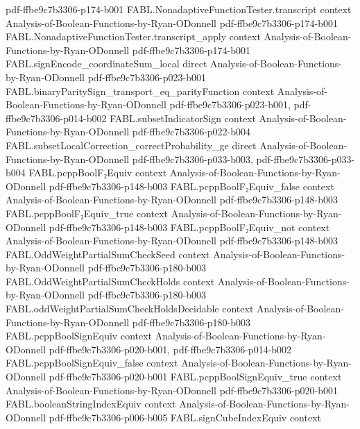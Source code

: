\begin{theorem}
  {pdf-ffbe9c7b3306-p174-b001}
\proofstep
  {FABL.NonadaptiveFunctionTester.transcript}
  {context}
  {Analysis-of-Boolean-Functions-by-Ryan-ODonnell}
  {pdf-ffbe9c7b3306-p174-b001}
\proofstep
  {FABL.NonadaptiveFunctionTester.transcript_apply}
  {context}
  {Analysis-of-Boolean-Functions-by-Ryan-ODonnell}
  {pdf-ffbe9c7b3306-p174-b001}
\proofstep
  {FABL.signEncode_coordinateSum_local}
  {direct}
  {Analysis-of-Boolean-Functions-by-Ryan-ODonnell}
  {pdf-ffbe9c7b3306-p023-b001}
\proofstep
  {FABL.binaryParitySign_transport_eq_parityFunction}
  {context}
  {Analysis-of-Boolean-Functions-by-Ryan-ODonnell}
  {pdf-ffbe9c7b3306-p023-b001,
    pdf-ffbe9c7b3306-p014-b002}
\proofstep
  {FABL.subsetIndicatorSign}
  {context}
  {Analysis-of-Boolean-Functions-by-Ryan-ODonnell}
  {pdf-ffbe9c7b3306-p022-b004}
\proofstep
  {FABL.subsetLocalCorrection_correctProbability_ge}
  {direct}
  {Analysis-of-Boolean-Functions-by-Ryan-ODonnell}
  {pdf-ffbe9c7b3306-p033-b003,
    pdf-ffbe9c7b3306-p033-b004}
\proofstep
  {FABL.pcppBoolF₂Equiv}
  {context}
  {Analysis-of-Boolean-Functions-by-Ryan-ODonnell}
  {pdf-ffbe9c7b3306-p148-b003}
\proofstep
  {FABL.pcppBoolF₂Equiv_false}
  {context}
  {Analysis-of-Boolean-Functions-by-Ryan-ODonnell}
  {pdf-ffbe9c7b3306-p148-b003}
\proofstep
  {FABL.pcppBoolF₂Equiv_true}
  {context}
  {Analysis-of-Boolean-Functions-by-Ryan-ODonnell}
  {pdf-ffbe9c7b3306-p148-b003}
\proofstep
  {FABL.pcppBoolF₂Equiv_not}
  {context}
  {Analysis-of-Boolean-Functions-by-Ryan-ODonnell}
  {pdf-ffbe9c7b3306-p148-b003}
\proofstep
  {FABL.OddWeightPartialSumCheckSeed}
  {context}
  {Analysis-of-Boolean-Functions-by-Ryan-ODonnell}
  {pdf-ffbe9c7b3306-p180-b003}
\proofstep
  {FABL.OddWeightPartialSumCheckHolds}
  {context}
  {Analysis-of-Boolean-Functions-by-Ryan-ODonnell}
  {pdf-ffbe9c7b3306-p180-b003}
\proofstep
  {FABL.oddWeightPartialSumCheckHoldsDecidable}
  {context}
  {Analysis-of-Boolean-Functions-by-Ryan-ODonnell}
  {pdf-ffbe9c7b3306-p180-b003}
\proofstep
  {FABL.pcppBoolSignEquiv}
  {context}
  {Analysis-of-Boolean-Functions-by-Ryan-ODonnell}
  {pdf-ffbe9c7b3306-p020-b001,
    pdf-ffbe9c7b3306-p014-b002}
\proofstep
  {FABL.pcppBoolSignEquiv_false}
  {context}
  {Analysis-of-Boolean-Functions-by-Ryan-ODonnell}
  {pdf-ffbe9c7b3306-p020-b001}
\proofstep
  {FABL.pcppBoolSignEquiv_true}
  {context}
  {Analysis-of-Boolean-Functions-by-Ryan-ODonnell}
  {pdf-ffbe9c7b3306-p020-b001}
\proofstep
  {FABL.booleanStringIndexEquiv}
  {context}
  {Analysis-of-Boolean-Functions-by-Ryan-ODonnell}
  {pdf-ffbe9c7b3306-p006-b005}
\proofstep
  {FABL.signCubeIndexEquiv}
  {context}

\end{theorem}
